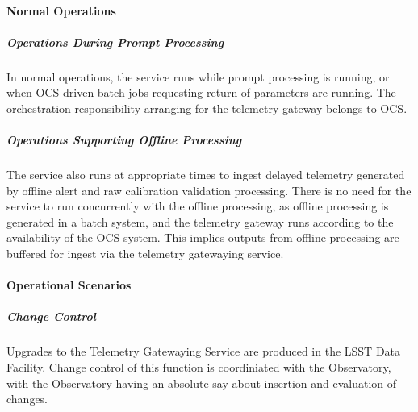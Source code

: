 \paragraph{Normal Operations}

\subparagraph{Operations During Prompt Processing}

In normal operations, the service runs while prompt processing is running,
or when OCS-driven batch jobs requesting return of parameters are running.
The orchestration responsibility arranging for the telemetry gateway belongs to OCS.

\subparagraph{Operations Supporting Offline Processing}
The service also runs at appropriate times to ingest delayed telemetry
generated by offline alert  and raw calibration validation processing. There is no need for the service
to run concurrently with the offline processing, as offline processing is
generated in a batch system, and the telemetry gateway runs according to
the availability of the OCS system. This implies outputs from offline processing
are buffered for ingest via the telemetry gatewaying service.

\paragraph{Operational Scenarios}

\subparagraph{Change Control}

Upgrades to the Telemetry Gatewaying Service are produced in the LSST Data Facility.
Change control of this function is coordiniated with the Observatory, with the
Observatory having an absolute say about insertion and evaluation of changes.
